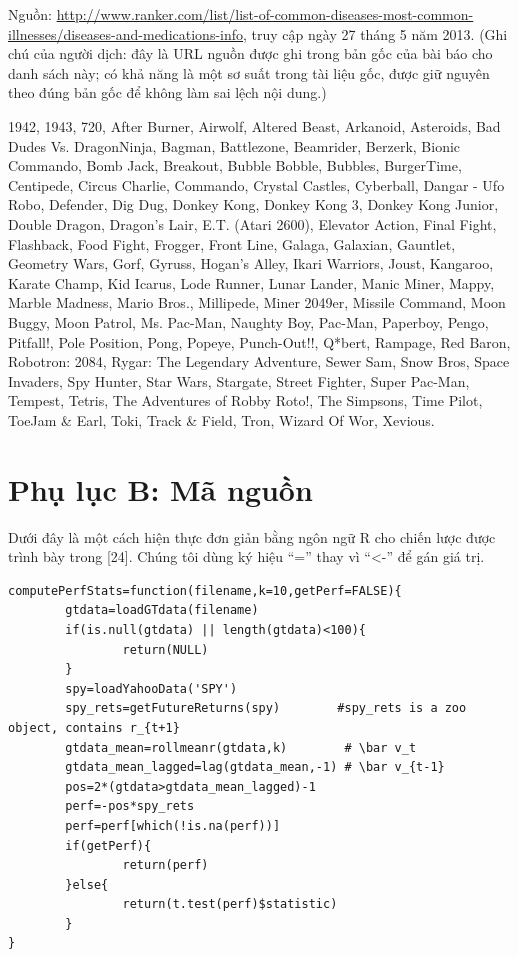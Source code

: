 \noindent Nguồn: \url{http://www.ranker.com/list/list-of-common-diseases-most-common-illnesses/diseases-and-medications-info}, truy cập ngày 27 tháng 5 năm 2013. (Ghi chú của người dịch: đây là URL nguồn được ghi trong bản gốc của bài báo cho danh sách này; có khả năng là một sơ suất trong tài liệu gốc, được giữ nguyên theo đúng bản gốc để không làm sai lệch nội dung.)

\smallskip
\noindent\small 1942, 1943, 720\textdegree{}, After Burner, Airwolf, Altered Beast, Arkanoid, Asteroids, Bad Dudes Vs. DragonNinja, Bagman, Battlezone, Beamrider, Berzerk, Bionic Commando, Bomb Jack, Breakout, Bubble Bobble, Bubbles, BurgerTime, Centipede, Circus Charlie, Commando, Crystal Castles, Cyberball, Dangar - Ufo Robo, Defender, Dig Dug, Donkey Kong, Donkey Kong 3, Donkey Kong Junior, Double Dragon, Dragon's Lair, E.T. (Atari 2600), Elevator Action, Final Fight, Flashback, Food Fight, Frogger, Front Line, Galaga, Galaxian, Gauntlet, Geometry Wars, Gorf, Gyruss, Hogan's Alley, Ikari Warriors, Joust, Kangaroo, Karate Champ, Kid Icarus, Lode Runner, Lunar Lander, Manic Miner, Mappy, Marble Madness, Mario Bros., Millipede, Miner 2049er, Missile Command, Moon Buggy, Moon Patrol, Ms. Pac-Man, Naughty Boy, Pac-Man, Paperboy, Pengo, Pitfall!, Pole Position, Pong, Popeye, Punch-Out!!, Q*bert, Rampage, Red Baron, Robotron: 2084, Rygar: The Legendary Adventure, Sewer Sam, Snow Bros, Space Invaders, Spy Hunter, Star Wars, Stargate, Street Fighter, Super Pac-Man, Tempest, Tetris, The Adventures of Robby Roto!, The Simpsons, Time Pilot, ToeJam \& Earl, Toki, Track \& Field, Tron, Wizard Of Wor, Xevious.
\normalsize

\section*{Phụ lục B: Mã nguồn}

Dưới đây là một cách hiện thực đơn giản bằng ngôn ngữ R cho chiến lược được trình bày trong [24]. Chúng tôi dùng ký hiệu ``='' thay vì ``<-'' để gán giá trị.

\begin{verbatim}
computePerfStats=function(filename,k=10,getPerf=FALSE){
        gtdata=loadGTdata(filename)
        if(is.null(gtdata) || length(gtdata)<100){
                return(NULL)
        }
        spy=loadYahooData('SPY')
        spy_rets=getFutureReturns(spy)        #spy_rets is a zoo object, contains r_{t+1}
        gtdata_mean=rollmeanr(gtdata,k)        # \bar v_t
        gtdata_mean_lagged=lag(gtdata_mean,-1) # \bar v_{t-1}
        pos=2*(gtdata>gtdata_mean_lagged)-1
        perf=-pos*spy_rets
        perf=perf[which(!is.na(perf))]
        if(getPerf){
                return(perf)
        }else{
                return(t.test(perf)$statistic)
        }
}
\end{verbatim}


